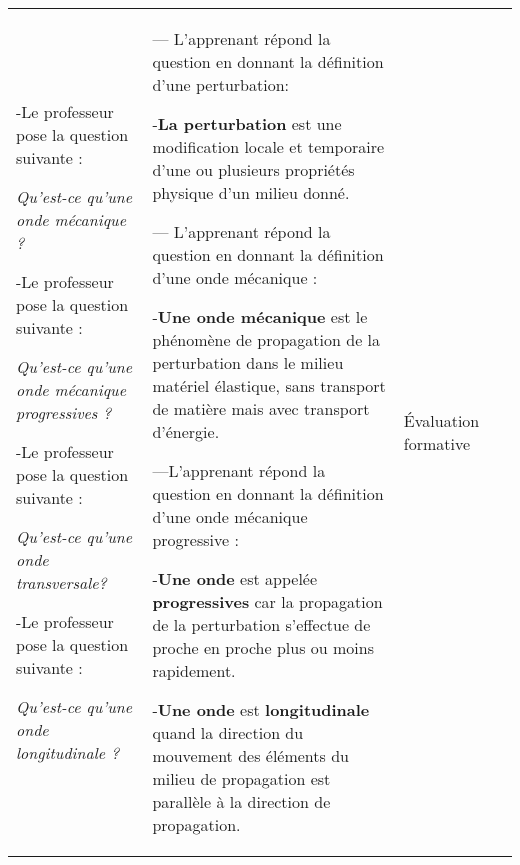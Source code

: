 \documentclass[12pt]{article}
\begin{document}
\begin{center}
\begin{tabular}{|p{}||p{}||p{}||p{}|}
-Le professeur pose la question suivante :

\emph{Qu’est-ce qu’une onde mécanique ?}


-Le professeur pose la question suivante :

\emph{Qu’est-ce qu’une onde
mécanique progressives ?}


-Le professeur pose la question suivante :

\emph{Qu’est-ce qu’une onde transversale?}


-Le professeur pose la question suivante :

\emph{Qu’est-ce qu’une onde longitudinale ?}


				  &
				  --- L’apprenant répond la question en donnant la
définition d’une perturbation:

-\textbf{La perturbation }est une modification locale et
temporaire d’une ou plusieurs propriétés physique
d’un milieu donné.
\vspace{0.5cm}

--- L’apprenant répond la question en donnant la
définition d’une onde mécanique :

-\textbf{Une onde mécanique} est le phénomène de
propagation de la perturbation dans le milieu matériel
élastique, sans transport de matière mais avec
transport d’énergie.
\vspace{0.5cm}

---L’apprenant répond la question en donnant la
définition d’une onde mécanique progressive :

-\textbf{Une onde} est appelée \textbf{progressives} car la
propagation de la perturbation s'effectue de proche en
proche plus ou moins rapidement.
\vspace{0.2cm}

-\textbf{Une onde} est \textbf{longitudinale} quand la direction du
mouvement des éléments du milieu de propagation
est parallèle à la direction de propagation.


				  & 
	Évaluation formative			  
\end{tabular}
\end{center}

\end{document}
